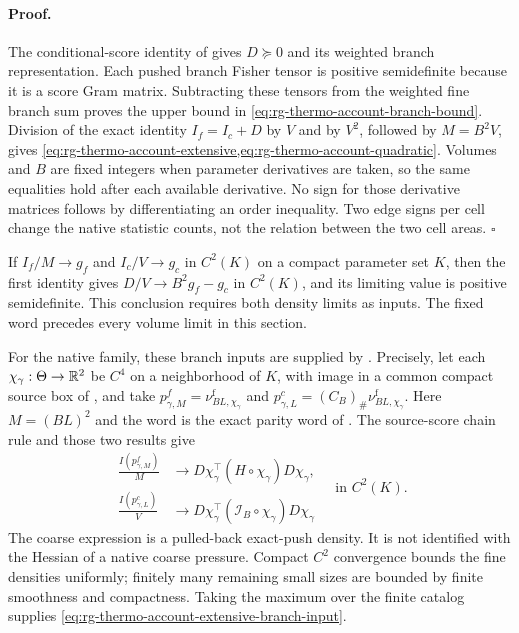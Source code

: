\paragraph{Proof.}
The conditional-score identity of
 gives $D\succeq0$ and its
weighted branch representation. Each pushed branch Fisher tensor is
positive semidefinite because it is a score Gram matrix. Subtracting
these tensors from the weighted fine branch sum proves the upper bound
in \cref{eq:rg-thermo-account-branch-bound}. Division of the exact
identity $I_f=I_c+D$ by $V$ and by $V^2$, followed by $M=B^2V$,
gives \cref{eq:rg-thermo-account-extensive,eq:rg-thermo-account-quadratic}.
Volumes and $B$ are fixed integers when parameter derivatives are taken,
so the same equalities hold after each available derivative. No sign
for those derivative matrices follows by differentiating an order
inequality. Two edge signs per cell change the native statistic counts,
not the relation between the two cell areas. $\square$

If $I_f/M\to g_f$ and $I_c/V\to g_c$ in $C^2(K)$ on a compact
parameter set $K$, then the first identity gives
$D/V\to B^2g_f-g_c$ in $C^2(K)$, and its limiting value is positive
semidefinite. This conclusion requires both density limits as inputs.
The fixed word precedes every volume limit in this section.

For the native family, these branch inputs are supplied by
.
Precisely, let each $\chi_\gamma:\Theta\to\mathbb R^2$ be $C^4$ on a
neighborhood of $K$, with image in a common compact source box of
, and take
$p^f_{\gamma,M}=\nu^{\mathrm f}_{BL,\chi_\gamma}$ and
$p^c_{\gamma,L}=(C_B)_\#\nu^{\mathrm f}_{BL,\chi_\gamma}$.
Here $M=(BL)^2$ and the word is the exact parity word of
. The source-score chain rule and
those two results give
\begin{equation}
 \begin{aligned}
 \frac{I(p^f_{\gamma,M})}{M}
 &\longrightarrow D\chi_\gamma^\top(H\circ\chi_\gamma)D\chi_\gamma,\\
 \frac{I(p^c_{\gamma,L})}{V}
 &\longrightarrow
 D\chi_\gamma^\top(\mathcal I_B\circ\chi_\gamma)D\chi_\gamma
 \end{aligned}
 \quad\text{in }C^2(K).
 \label{eq:rg-thermo-account-native-density-inputs}
\end{equation}
The coarse expression is a pulled-back exact-push density. It is not
identified with the Hessian of a native coarse pressure. Compact
$C^2$ convergence bounds the fine densities uniformly; finitely many
remaining small sizes are bounded by finite smoothness and compactness.
Taking the maximum over the finite catalog supplies
\cref{eq:rg-thermo-account-extensive-branch-input}.

